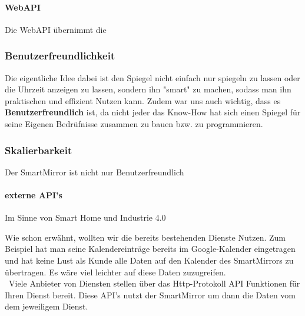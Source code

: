 \paragraph{WebAPI}
Die WebAPI übernimmt die 


\subsubsection{Benutzerfreundlichkeit}\label{Benutzerfreundlichkeit}
Die eigentliche Idee dabei ist den Spiegel nicht einfach nur spiegeln zu lassen oder die Uhrzeit anzeigen zu lassen, sondern ihn "smart" zu machen, sodass man ihn praktischen und effizient Nutzen kann. Zudem war uns auch wichtig, dass es \textbf{Benutzerfreundlich} ist, da nicht jeder das Know-How hat sich einen Spiegel für seine Eigenen Bedrüfnisse zusammen zu bauen bzw. zu programmieren.
\subsubsection{Skalierbarkeit}\label{Skalierbarkeit}
Der SmartMirror ist nicht nur Benutzerfreundlich 
\paragraph{externe API's}
Im Sinne von Smart Home und Industrie 4.0

Wie schon erwähnt, wollten wir die bereits bestehenden Dienste Nutzen. Zum Beispiel hat man seine Kalendereinträge bereits im Google-Kalender eingetragen und hat keine Lust als Kunde alle Daten auf den Kalender des SmartMirrors zu übertragen. Es wäre viel leichter auf diese Daten zuzugreifen. \\\
Viele Anbieter von Diensten stellen über das Http-Protokoll API Funktionen für Ihren Dienst bereit. Diese API's nutzt der SmartMirror um dann die Daten vom dem jeweiligem Dienst.\\\
